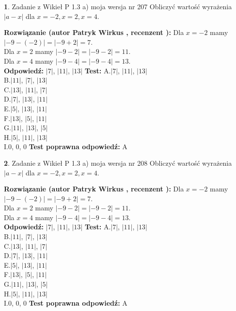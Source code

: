 \documentclass[12pt, a4paper]{article}
\theoremstyle{definition} %
\newtheorem{zad}{}
\newcommand{\zadStart}[1]{\begin{zad}#1\newline}
\newcommand{\zadStop}{\end{zad}}
\newcommand{\rozwStart}[2]{\noindent \textbf{Rozwiązanie (autor #1 , recenzent #2): }\newline}
\newcommand{\rozwStop}{\newline}
\newcommand{\odpStart}{\noindent \textbf{Odpowiedź:}\newline}
\newcommand{\odpStop}{\newline}
\newcommand{\testStart}{\noindent \textbf{Test:}\newline}
\newcommand{\testStop}{\newline}
\newcommand{\kluczStart}{\noindent \textbf{Test poprawna odpowiedź:}\newline}
\newcommand{\kluczStop}{\newline}
\begin{document}
\zadStart{Zadanie z Wikieł P 1.3 a) moja wersja nr 207}
Obliczyć wartość wyrażenia $|a - x|$ dla $x=-2,x=2,x=4$.
\zadStop
\rozwStart{Patryk Wirkus}{}
Dla $x = -2$ mamy $|-9 - (-2)| = |-9 + 2| = 7$.\\
Dla $x = 2$ mamy $|-9 - 2| = |-9 - 2| = 11$.\\
Dla $x = 4$ mamy $|-9 - 4| = |-9 - 4| = 13$.\\
\rozwStop
\odpStart
$|7|$, $|11|$, $|13|$
\odpStop
\testStart
A.$|7|$, $|11|$, $|13|$\\
B.$|11|$, $|7|$, $|13|$\\
C.$|13|$, $|11|$, $|7|$\\
D.$|7|$, $|13|$, $|11|$\\
E.$|5|$, $|13|$, $|11|$\\
F.$|13|$, $|5|$, $|11|$\\
G.$|11|$, $|13|$, $|5|$\\
H.$|5|$, $|11|$, $|13|$\\
I.$0$, $0$, $0$
\testStop
\kluczStart
A
\kluczStop



\zadStart{Zadanie z Wikieł P 1.3 a) moja wersja nr 208}
Obliczyć wartość wyrażenia $|a - x|$ dla $x=-2,x=2,x=4$.
\zadStop
\rozwStart{Patryk Wirkus}{}
Dla $x = -2$ mamy $|-9 - (-2)| = |-9 + 2| = 7$.\\
Dla $x = 2$ mamy $|-9 - 2| = |-9 - 2| = 11$.\\
Dla $x = 4$ mamy $|-9 - 4| = |-9 - 4| = 13$.\\
\rozwStop
\odpStart
$|7|$, $|11|$, $|13|$
\odpStop
\testStart
A.$|7|$, $|11|$, $|13|$\\
B.$|11|$, $|7|$, $|13|$\\
C.$|13|$, $|11|$, $|7|$\\
D.$|7|$, $|13|$, $|11|$\\
E.$|5|$, $|13|$, $|11|$\\
F.$|13|$, $|5|$, $|11|$\\
G.$|11|$, $|13|$, $|5|$\\
H.$|5|$, $|11|$, $|13|$\\
I.$0$, $0$, $0$
\testStop
\kluczStart
A
\kluczStop
\end{document}
